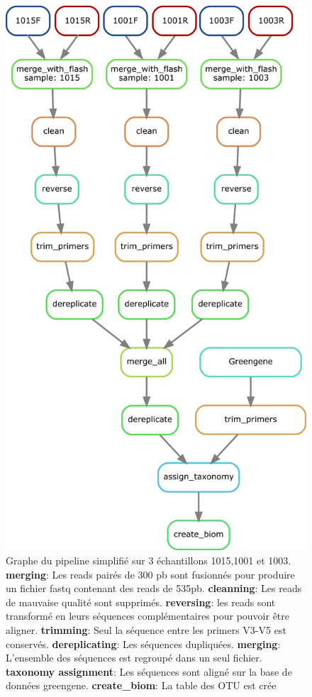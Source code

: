 \documentclass[12pt,a4paper]{article}
\begin{document}
\begin{figure}[!ht]
\begin{center}
\includegraphics[scale=0.5]{img/pipeline_trio.png}\hfill
\end{center}
\caption{Graphe du pipeline simplifié sur 3 échantillons 1015,1001 et 1003.\\ \textbf{merging}: Les reads pairés de 300 pb sont fusionnés  pour produire un fichier fastq contenant des reads de 535pb. \textbf{cleanning}: Les reads de mauvaise qualité sont supprimés. \textbf{reversing}: les reads sont transformé en leurs séquences complémentaires pour pouvoir être aligner. \textbf{trimming}: Seul la séquence entre les primers V3-V5 est conservés. \textbf{dereplicating}: Les séquences dupliquées. \textbf{merging}: L'ensemble des séquences est regroupé dans un seul fichier. \textbf{taxonomy assignment}: Les séquences sont aligné sur la base de données greengene. \textbf{create\_biom}: La table des OTU est crée }
\label{pipeline_trio}
\end{figure}
\end{document}
